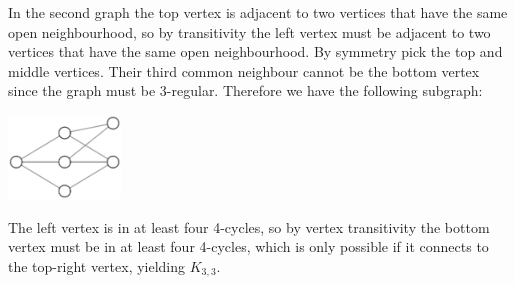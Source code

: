 \documentclass[a4paper, 12pt]{article}
\begin{document}
\begin{enumerate}
\begin{enumerate}
In the second graph the top vertex is adjacent to two vertices that have the same open neighbourhood, so by transitivity the left vertex must be adjacent to two vertices that have the same open neighbourhood. By symmetry pick the top and middle vertices. Their third common neighbour cannot be the bottom vertex since the graph must be 3-regular. Therefore we have the following subgraph:
\begin{center}
\includegraphics[valign=c, width=3cm]{kl}
\end{center}
The left vertex is in at least four 4-cycles, so by vertex transitivity the bottom vertex must be in at least four 4-cycles, which is only possible if it connects to the top-right vertex, yielding \(K_{3,3}\).

\end{enumerate}

\end{enumerate}
\end{document}
